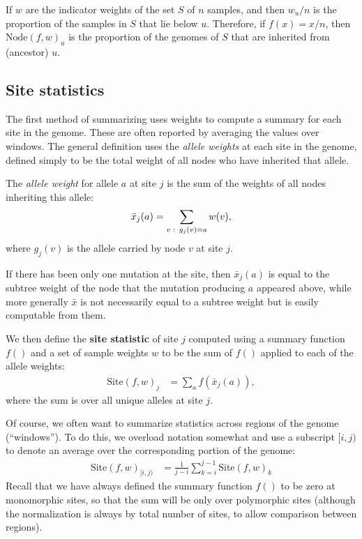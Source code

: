 \documentclass{article}
\newcommand{\site}{\mbox{Site}} %
\newcommand{\node}{\mbox{Node}} %
\newcommand{\iw}{w} %
\newcommand{\aw}{{\bar x}} %
\begin{document}
\begin{example} \label{ex:ancestry_props}
    If $\iw$ are the indicator weights of the set $S$ of $n$ samples,
    and then $\iw_u / n$ is the proportion of the samples in $S$ that lie below $u$.
    Therefore, if $f(x) = x / n$,
    then $\node(f, \iw)_u$ is the proportion of the genomes of $S$
    that are inherited from (ancestor) $u$.
\end{example}


\subsection*{Site statistics}

The first method of summarizing uses weights
to compute a summary for each site in the genome.
These are often reported by averaging the values over windows.
The general definition uses the \emph{allele weights} at each site in the genome,
defined simply to be the total weight of all nodes who have inherited that allele.

\begin{definition}
    The \emph{allele weight} for allele $a$ at site $j$ is the sum of the weights
    of all nodes inheriting this allele:
    \begin{align*}
        \aw_j(a) = \sum_{v \st g_j(v) = a} \iw(v) ,
    \end{align*}
    where $g_j(v)$ is the allele carried by node $v$ at site $j$.
\end{definition}

If there has been only one mutation at the site,
then $\aw_j(a)$ is equal to the subtree weight of the node that the mutation producing $a$
appeared above,
while more generally $\aw$ is not necessarily equal to a subtree weight
but is easily computable from them.

We then define the \textbf{site statistic} of site $j$ computed using a summary function $f()$
and a set of sample weights $\iw$
to be the sum of $f()$ applied to each of the allele weights:
\begin{align}
    \site(f, \iw)_j
    &=
    \sum_{a} f(\aw_j(a)) ,
\end{align}
where the sum is over all unique alleles at site $j$.

Of course, we often want to summarize statistics across regions of the genome (``windows'').
To do this, we overload notation somewhat and use a subscript $[i,j)$ to denote an average
over the corresponding portion of the genome:
\begin{align}
    \site(f, \iw)_{[i,j)}
    &=
    \frac{1}{j-i} \sum_{k=i}^{j-1} \site(f, \iw)_k
\end{align}
Recall that we have always defined the summary function $f()$ to be zero at monomorphic sites,
so that the sum will be only over polymorphic sites
(although the normalization is always by total number of sites, to allow comparison between regions).
\end{document}
